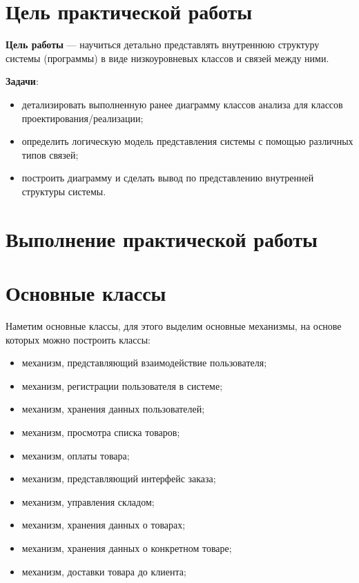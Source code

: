 \graphicspath{{./img/}} %

\section*{\LARGE Цель практической работы}

\textbf{Цель работы} --- научиться детально представлять внутреннюю структуру
системы (программы) в виде низкоуровневых классов и связей между ними.\par
\textbf{Задачи}:
\begin{itemize}
	\item детализировать выполненную ранее диаграмму классов анализа для
		классов проектирования/реализации;
	\item определить логическую модель представления системы с помощью
		различных типов связей;
	\item построить диаграмму и сделать вывод по представлению
		внутренней структуры системы.
\end{itemize}

\clearpage

\section*{\LARGE Выполнение практической работы}
\section{Основные классы}
Наметим основные классы, для этого выделим основные
механизмы, на основе которых можно построить классы:

\begin{itemize}
	\item механизм, представляющий взаимодействие пользователя;
	\item механизм, регистрации пользователя в системе;
	\item механизм, хранения данных пользователей;
	\item механизм, просмотра списка товаров;
	\item механизм, оплаты товара;
	\item механизм, представляющий интерфейс заказа;
	\item механизм, управления складом;
	\item механизм, хранения данных о товарах;
	\item механизм, хранения данных о конкретном товаре;
	\item механизм, доставки товара до клиента;
\end{itemize}

